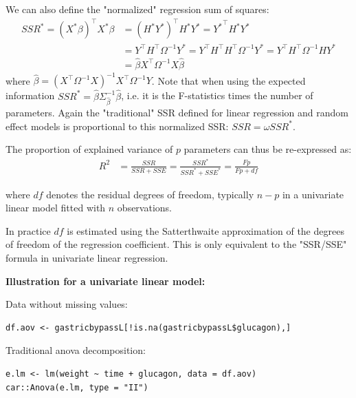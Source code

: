 \documentclass[12pt]{article}
\newcommand\Warning[1][3ex]{%
\renewcommand\stacktype{L}%
\scaleto{\stackon[1.3pt]{\color{red}$\triangle$}{\tiny\bfseries !}}{#1}%
\xspace
}
\newcommand\trans[1]{{#1}^\intercal}%
\begin{document}
\bigskip

We can also define the "normalized" regression sum of squares:
\begin{align*}
SSR^* = \trans{(X^*\beta)}X^*\beta &= \trans{\left(H^* Y^*\right)} H^* Y^* = \trans{Y^*} H^* Y^* \\
&= \trans{Y} \trans{H} \Omega^{-1} Y^* = \trans{Y} \trans{H} \trans{H} \Omega^{-1} Y^* = \trans{Y} \trans{H} \Omega^{-1} H Y^* \\
&= \widehat{\beta} \trans{X} \Omega^{-1} X \widehat{\beta}
\end{align*}
where \(\widehat{\beta}= \left(\trans{X}\Omega^{-1}
X\right)^{-1}\trans{X} \Omega^{-1} Y\). Note that when using the
expected information \(SSR^* = \widehat{\beta}
\Sigma^{-1}_{\widehat{\beta}} \widehat{\beta}\), i.e. it is the
F-statistics times the number of parameters. Again the "traditional"
SSR defined for linear regression and random effect models is
proportional to this normalized SSR: \(SSR=\omega SSR^{*}\).

\bigskip

The proportion of explained variance of \(p\) parameters can thus be
re-expressed as:
\begin{align*}
R^2 &= \frac{SSR}{SSR+SSE} = \frac{SSR^*}{SSR^*+SSE^*}= \frac{Fp}{Fp+df}
\end{align*}

where \(df\) denotes the residual degrees of freedom, typically
\(n-p\) in a univariate linear model fitted with \(n\)
observations. \newline \Warning In practice \(df\) is estimated using the
Satterthwaite approximation of the degrees of freedom of the
regression coefficient. This is only equivalent to the "SSR/SSE"
formula in univariate linear regression.

\bigskip
\bigskip

\textbf{Illustration for a univariate linear model:}

\bigskip

Data without missing values:
\lstset{language=r,label= ,caption= ,captionpos=b,numbers=none}
\begin{lstlisting}
df.aov <- gastricbypassL[!is.na(gastricbypassL$glucagon),]
\end{lstlisting}

Traditional anova decomposition:
\lstset{language=r,label= ,caption= ,captionpos=b,numbers=none}
\begin{lstlisting}
e.lm <- lm(weight ~ time + glucagon, data = df.aov)
car::Anova(e.lm, type = "II")
\end{lstlisting}
\end{document}
